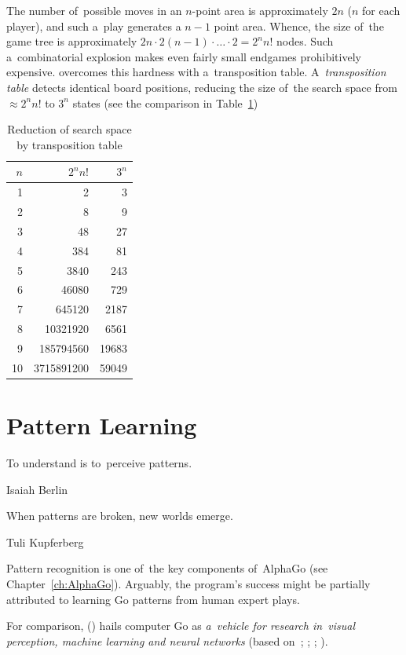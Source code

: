 The number of~possible moves in an $n$-point area is approximately $2n$ ($n$ for each player), and such a~play generates a $n-1$ point area.
Whence, the size of~the game tree is approximately $2n\cdot2(n-1)\cdot \ldots \cdot2 = 2^n n!$ nodes.
Such a~combinatorial explosion makes even fairly small endgames prohibitively expensive.
\Mueller{} overcomes this hardness with a~transposition table.
A~\emph{transposition table} detects identical board positions, reducing the size of~the search space from $\approx 2^n n!$ to $3^n$ states (see the comparison in Table~\ref{tab:reduction-transp-tab})
\begin{table}[!htbp]
  \centering
  \begin{tabular}{ |rrr| }
    \hline
    \textbf{$n$} & \textbf{$2^nn!$} & \textbf{$3^n$} \\
    \hline
    1	&	2	&	3 \\ 
    2	&	8	&	9 \\ 
    3	&	48	&	27 \\ 
    4	&	384	&	81 \\ 
    5	&	3840	&	243 \\ 
    6	&	46080	&	729 \\ 
    7	&	645120	&	2187 \\ 
    8	&	10321920	&	6561 \\ 
    9	&	185794560	&	19683 \\ 
    10	&	3715891200	&	59049 \\ 
    \hline
  \end{tabular}
  \caption{Reduction of search space by transposition table}
  \label{tab:reduction-transp-tab}
\end{table}

\section{Pattern Learning}
{
  \setlength{\epigraphwidth}{0.55\textwidth}
  \epigraph{To understand is to~perceive patterns.}
  {Isaiah Berlin}
  \epigraph{When patterns are broken, new worlds emerge.}
  {Tuli Kupferberg}
}%
Pattern recognition is one of~the key components of~AlphaGo (see Chapter~\ref{ch:AlphaGo}).
Arguably, the program's success might be partially attributed to learning Go patterns from human expert plays.

For comparison, (\cite{Muller1995computer}) hails computer Go as \emph{a~vehicle for research in~visual perception, machine learning and neural networks} (based on~\cite{Wilcox79}; \cite{Enderton1991golem}; \cite{Stoutamire1991machine}; \cite{Schraudolph1994temporal}).

